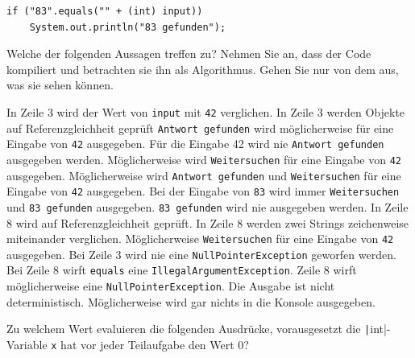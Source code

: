 \documentclass[11pt]{exam} %
\newcommand{\code}[1]{\texttt|#1|}
\newcommand{\fillinline}[1]{\ifprintanswers\fillin[\code{#1}][3cm]\fi\xrfill[-1pt]{0.2mm}}
\begin{document}
\begin{questions}
\begin{verbatim}
if ("83".equals("" + (int) input))
	System.out.println("83 gefunden");
\end{verbatim}
Welche der folgenden Aussagen treffen zu? Nehmen Sie an, dass der Code kompiliert und betrachten sie ihn als Algorithmus. Gehen Sie nur von dem aus, was sie sehen können. 
\begin{checkboxes}
\choice In Zeile 3 wird der Wert von \texttt{input} mit \texttt{42} verglichen.
\CorrectChoice In Zeile 3 werden Objekte auf Referenzgleichheit geprüft
\CorrectChoice \texttt{Antwort gefunden} wird möglicherweise für eine Eingabe von \texttt{42} ausgegeben.
\choice Für die Eingabe 42 wird nie \texttt{Antwort gefunden} ausgegeben werden.
\CorrectChoice Möglicherweise wird \texttt{Weitersuchen} für eine Eingabe von \texttt{42} ausgegeben.
\choice Möglicherweise wird \texttt{Antwort gefunden} und \texttt{Weitersuchen} für eine Eingabe von \texttt{42} ausgegeben.
\CorrectChoice Bei der Eingabe von \texttt{83} wird immer \texttt{Weitersuchen} und \texttt{83 gefunden} ausgegeben.
\choice \texttt{83 gefunden} wird nie ausgegeben werden.
\choice In Zeile 8 wird auf Referenzgleichheit geprüft.
\CorrectChoice In Zeile 8 werden zwei Strings zeichenweise miteinander verglichen.
\CorrectChoice Möglicherweise \texttt{Weitersuchen} für eine Eingabe von \texttt{42} ausgegeben.
\choice Bei Zeile 3 wird nie eine \texttt{NullPointerException} geworfen werden.
\choice Bei Zeile 8 wirft \texttt{equals} eine \texttt{IllegalArgumentException}.
\CorrectChoice Zeile 8 wirft möglicherweise eine \texttt{NullPointerException}.
\choice Die Ausgabe ist nicht deterministisch.
\CorrectChoice Möglicherweise wird gar nichts in die Konsole ausgegeben.
\end{checkboxes}
\question Zu welchem Wert evaluieren die folgenden Ausdrücke, vorausgesetzt die \code{int}-Variable \texttt{x} hat vor jeder Teilaufgabe den Wert 0?
\end{questions}
\end{document}
